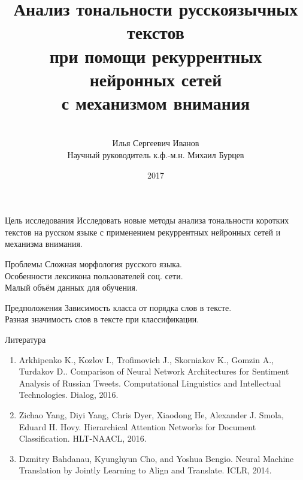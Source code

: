 \documentclass{beamer}
\title[\hbox to 56mm{\hfill\insertframenumber\,/\,\inserttotalframenumber}]
{Анализ тональности русскоязычных текстов\\
при помощи рекуррентных нейронных сетей\\
с механизмом внимания}
\author[И.\,С. Иванов]{\large \\Илья Сергеевич Иванов\\
{\small Научный руководитель к.ф.-м.н. Михаил Бурцев}}
\institute{\large
Московский физико-технический институт\\
Факультет Инноваций и Высоких Технологий\\
Кафедра Анализа Данных}
\date{2017}
\begin{document}
\begin{frame}
\titlepage
\end{frame}
\begin{frame}{Цель исследования}
Исследовать новые методы анализа тональности коротких текстов на русском языке с применением рекуррентных нейронных сетей и механизма внимания.
\begin{block}{Проблемы}
	Сложная морфология русского языка.\\
	Особенности лексикона пользователей соц. сети.\\
	Малый объём данных для обучения.\\
\end{block}

\begin{block}{Предположения}
	Зависимость класса от порядка слов в тексте.\\
	Разная значимость слов в тексте при классификации.
\end{block}

\end{frame}
\begin{frame}{Литература}
	\begin{enumerate}
		\item Arkhipenko K., Kozlov I., Trofimovich J., Skorniakov K., Gomzin A., Turdakov D.. Comparison of Neural Network Architectures for Sentiment Analysis of Russian Tweets. Computational Linguistics and Intellectual Technologies. Dialog, 2016.	
		\item Zichao Yang, Diyi Yang, Chris Dyer, Xiaodong He, Alexander J. Smola, Eduard H. Hovy. Hierarchical Attention Networks for Document Classification. HLT-NAACL, 2016.
		\item Dzmitry Bahdanau, Kyunghyun Cho, and Yoshua Bengio. Neural Machine Translation by Jointly Learning to Align and Translate. ICLR, 2014.
	\end{enumerate}
\end{frame}
\end{document}
